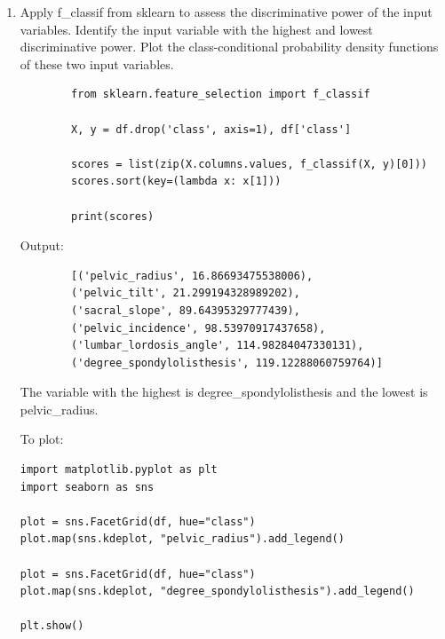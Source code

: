 \documentclass[12pt]{article}
\begin{document}
\begin{enumerate}
    \item Apply f\_classif from sklearn to assess the discriminative power of the input variables. Identify the input variable with the highest and lowest discriminative power. Plot the class-conditional probability density functions of these two input variables.
    
    \begin{lstlisting}
        from sklearn.feature_selection import f_classif

        X, y = df.drop('class', axis=1), df['class']

        scores = list(zip(X.columns.values, f_classif(X, y)[0]))
        scores.sort(key=(lambda x: x[1]))

        print(scores)
    \end{lstlisting}
    Output:
    \begin{lstlisting}
        [('pelvic_radius', 16.86693475538006),
        ('pelvic_tilt', 21.299194328989202),
        ('sacral_slope', 89.64395329777439),
        ('pelvic_incidence', 98.53970917437658), 
        ('lumbar_lordosis_angle', 114.98284047330131),
        ('degree_spondylolisthesis', 119.12288060759764)]
    \end{lstlisting}
    
    The variable with the highest is degree\_spondylolisthesis and the lowest is pelvic\_radius.

    To plot:

    \begin{lstlisting}
import matplotlib.pyplot as plt
import seaborn as sns

plot = sns.FacetGrid(df, hue="class")
plot.map(sns.kdeplot, "pelvic_radius").add_legend()

plot = sns.FacetGrid(df, hue="class")
plot.map(sns.kdeplot, "degree_spondylolisthesis").add_legend()

plt.show()
    \end{lstlisting}


\end{enumerate}
\end{document}
